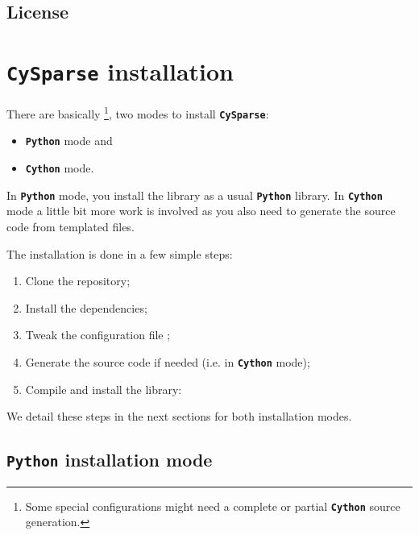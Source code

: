 \documentclass[letterpaper,10pt,english]{sphinxmanual}
\begin{document}
\section{License}
\label{introduction:license}

\chapter{\textbf{\texttt{CySparse}} installation}
\label{installation:cysparse-installation}\label{installation::doc}
There are basically \footnote{
Some special configurations might need a complete or partial \textbf{\texttt{Cython}} source generation.
}, two modes to install \textbf{\texttt{CySparse}}:
\begin{itemize}
\item {} 
\textbf{\texttt{Python}} mode and

\item {} 
\textbf{\texttt{Cython}} mode.

\end{itemize}

In \textbf{\texttt{Python}} mode, you install the library as a usual \textbf{\texttt{Python}} library. In \textbf{\texttt{Cython}} mode a little bit more work is involved as you also need to generate the source code from templated files.

The installation is done in a few simple steps:
\begin{enumerate}
\item {} 
Clone the repository;

\item {} 
Install the dependencies;

\item {} 
Tweak the configuration file ;

\item {} 
Generate the source code if needed (i.e. in \textbf{\texttt{Cython}} mode);

\item {} 
Compile and install the library:

\end{enumerate}

We detail these steps in the next sections for both installation modes.


\section{\textbf{\texttt{Python}} installation mode}
\label{installation:python-installation-mode}
\end{document}
